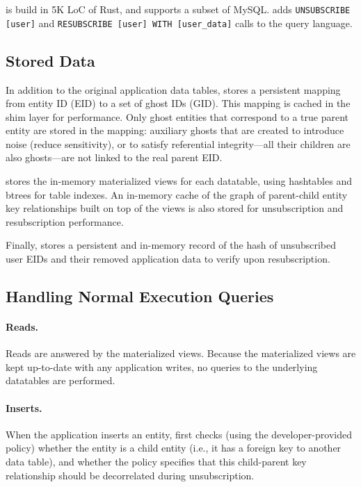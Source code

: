 \name is build in 5K LoC of Rust, and supports a subset of MySQL. \name adds \texttt{UNSUBSCRIBE
[user]} and \texttt{RESUBSCRIBE [user] WITH [user\_data]} calls to the query language.

\subsection{Stored Data}
In addition to the original application data tables, \name stores a persistent mapping from entity
ID (EID) to a set of ghost IDs (GID). This mapping is cached in the shim layer for performance. Only
ghost entities that correspond to a true parent entity are stored in the mapping: auxiliary ghosts that are
created to introduce noise (reduce sensitivity), or to satisfy referential integrity---all their
children are also ghosts---are not linked to the real parent EID.

\name stores the in-memory materialized views for each datatable, using hashtables and btrees for
table indexes. An in-memory cache of the graph of parent-child entity key relationships built on
top of the views is also stored for unsubscription and resubscription performance.

Finally, \name stores a persistent and in-memory record of the hash of unsubscribed user EIDs 
and their removed application data to verify upon resubscription.

\subsection{Handling Normal Execution Queries}
\paragraph{Reads.}
Reads are answered by the materialized views. Because the materialized views are kept up-to-date with any application
writes, no queries to the underlying datatables are performed.

\paragraph{Inserts.}
When the application inserts an entity, \name first checks (using the developer-provided policy)
whether the entity is a child entity (i.e., it has a foreign key to another data table), and
whether the policy specifies that this child-parent key relationship should be decorrelated during
unsubscription. 

